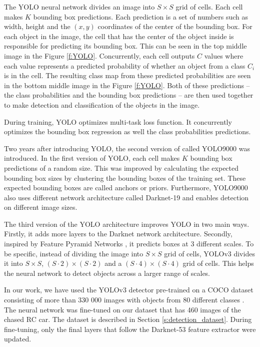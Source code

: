 The YOLO neural network divides an image into $S\times S$ grid of cells. Each cell makes $K$ bounding box predictions. Each prediction is a set of numbers such as width, height and the $(x,y)$ coordinates of the center of the bounding box. For each object in the image, the cell that has the center of the object inside is responsible for predicting its bounding box. This can be seen in the top middle image in the Figure \ref{f:YOLO}. Concurrently, each cell outputs $C$ values where each value represents a predicted probability of whether an object from a class $C_i$ is in the cell. The resulting class map from these predicted probabilities are seen in the bottom middle image in the Figure \ref{f:YOLO}. Both of these predictions -- the class probabilities and the bounding box predictions -- are then used together to make detection and classification of the objects in the image.
\par

During training, YOLO optimizes multi-task loss function. It concurrently optimizes the bounding box regression as well the class probabilities predictions.


Two years after introducing YOLO, the second version of called YOLO9000 \cite{YOLO9000} was introduced. In the first version of YOLO, each cell makes $K$ bounding box predictions of a random size. This was improved by calculating the expected bounding box sizes by clustering the bounding boxes of the training set. These expected bounding boxes are called anchors or priors. Furthermore, YOLO9000 also uses different network architecture called Darknet-19 and enables detection on different image sizes. \par


The third version of the YOLO architecture \cite{YOLOv3} improves YOLO in two main ways. Firstly, it adds more layers to the Darknet network architecture. Secondly, inspired by Feature Pyramid Networks \cite{FPN}, it predicts boxes at 3 different scales. To be specific, instead of dividing the image into $S\times S$ grid of cells, YOLOv3 divides it into $S\times S$, $(S\cdot2)\times (S\cdot2)$ and a $(S\cdot4)\times (S\cdot4)$ grid of cells. This helps the neural network to detect objects across a larger range of scales.


In our work, we have used the YOLOv3 detector pre-trained on a COCO dataset consisting of more than 330 000 images with objects from 80 different classes \cite{COCO_dataset}. The neural network was fine-tuned on our dataset that has 460 images of the chased RC car. The dataset is described in Section \ref{s:detection_dataset}. During fine-tuning, only the final layers that follow the Darknet-53 feature extractor were updated.




